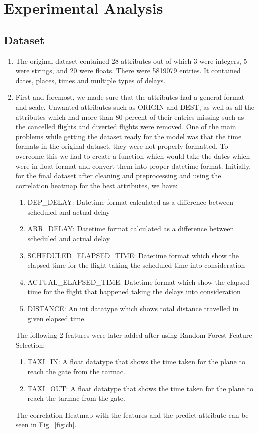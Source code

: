 \documentclass[conference]{IEEEtran}
\begin{document}
\section{Experimental Analysis}\label{Section IV}

\subsection{Dataset}\label{dataset}

\begin{enumerate}[label=\roman*.]
\item The original dataset contained 28 attributes out of which 3 were integers, 5 were strings, and 20 were floats. There were 5819079 entries. It contained dates, places, times and multiple types of delays. 
\item First and foremost, we made sure that the attributes had a general format and scale. Unwanted attributes such as ORIGIN and DEST, as well as all the attributes which had more than 80 percent of their entries missing such as the cancelled flights and diverted  flights were removed. One of the main problems while getting the dataset ready for the model was that the time formats in the original dataset, they were not properly formatted. To overcome this we had to create a function which would take the dates which were in float format and convert them into proper datetime format. Initially, for the final dataset after cleaning and preprocessing and using the correlation heatmap for the best attributes, we have:

\begin{enumerate}
\item DEP\_DELAY: Datetime format calculated as a difference between scheduled and actual delay
\item ARR\_DELAY: Datetime format calculated as a difference between scheduled and actual delay
\item SCHEDULED\_ELAPSED\_TIME: Datetime format which show the elapsed time for the flight taking the scheduled time into consideration
\item ACTUAL\_ELAPSED\_TIME: Datetime format which show the elapsed time for the flight that happened taking the delays into consideration
\item DISTANCE: An int datatype which shows total distance travelled in given elapsed time.
\end{enumerate}

The following 2 features were later added after using Random Forest Feature Selection:
\begin{enumerate}
\item TAXI\_IN: A float datatype that shows the time taken for the plane to reach the gate from the tarmac.
\item TAXI\_OUT: A float datatype that shows the time taken for the plane to reach the tarmac from the gate.
\end{enumerate} 
The correlation Heatmap with the features and the predict attribute can be seen in Fig.~\ref{fig:ch}.
\end{enumerate}
\end{document}
